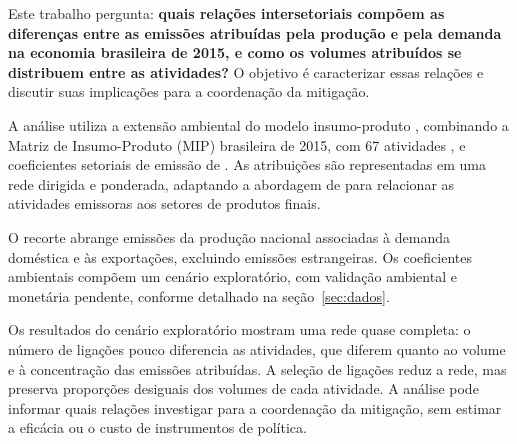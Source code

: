 Este trabalho pergunta: \textbf{quais relações intersetoriais compõem as diferenças entre as emissões atribuídas pela produção e pela demanda na economia brasileira de 2015, e como os volumes atribuídos se distribuem entre as atividades?} O objetivo é caracterizar essas relações e discutir suas implicações para a coordenação da mitigação.

A análise utiliza a extensão ambiental do modelo insumo-produto \parencite{millerBlair2009}, combinando a Matriz de Insumo-Produto (MIP) brasileira de 2015, com 67 atividades \parencite{ibge2015mip}, e coeficientes setoriais de emissão de \textcite{sanguinetAzzoni2024}. As atribuições são representadas em uma rede dirigida e ponderada, adaptando a abordagem de \textcite{huang2019} para relacionar as atividades emissoras aos setores de produtos finais.

O recorte abrange emissões da produção nacional associadas à demanda doméstica e às exportações, excluindo emissões estrangeiras. Os coeficientes ambientais compõem um cenário exploratório, com validação ambiental e monetária pendente, conforme detalhado na seção~\ref{sec:dados}.

Os resultados do cenário exploratório mostram uma rede quase completa: o número de ligações pouco diferencia as atividades, que diferem quanto ao volume e à concentração das emissões atribuídas. A seleção de ligações reduz a rede, mas preserva proporções desiguais dos volumes de cada atividade. A análise pode informar quais relações investigar para a coordenação da mitigação, sem estimar a eficácia ou o custo de instrumentos de política.

